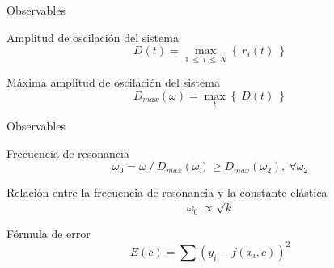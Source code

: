 \begin{frame}{Observables}
    \begin{block}{Amplitud de oscilación del sistema}
        \begin{equation*}
            D(t) = \max_{1\ \leq\ i\ \leq\ N} \left\{\ r_i(t)\ \right\}
        \end{equation*}
    \end{block}

    \begin{block}{Máxima amplitud de oscilación del sistema}
        \begin{equation*}
            D_{max}(\omega) = \max_{t} \left\{\ D(t)\ \right\}
        \end{equation*}
    \end{block}
\end{frame}

\begin{frame}{Observables}
    \small{
    \begin{block}{Frecuencia de resonancia}
        \begin{equation*}
            \omega_{0} = \omega\ /\ D_{max}(\omega) \geq D_{max}(\omega_2),\ \forall\omega_2
        \end{equation*}
    \end{block}

    \begin{block}{Relación entre la frecuencia de resonancia y la constante elástica}
        \begin{equation*}
            \omega_{0}\ \propto \sqrt{k}
        \end{equation*}
    \end{block}

    \begin{block}{Fórmula de error}
        \begin{equation*}
            E(c) = \sum (y_i - f(x_i, c))^2
        \end{equation*}
    \end{block}
    }
\end{frame}

